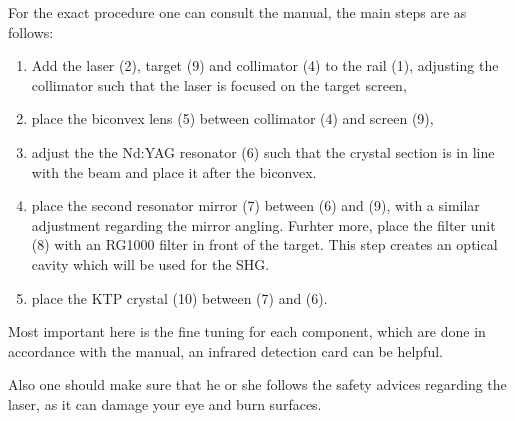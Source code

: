 For the exact procedure one can consult the manual, the main steps are as follows:
\begin{enumerate}
  \item Add the laser (2), target (9) and collimator (4) to the rail (1), adjusting 
    the collimator such that the laser is focused on the target screen,
  \item place the biconvex lens (5) between collimator (4) and screen (9),
  \item adjust the the Nd:YAG resonator (6) such that the crystal section is in line with the beam
    and place it after the biconvex.
  \item place the second resonator mirror (7) between (6) and (9), with a similar adjustment
    regarding the mirror angling. Furhter more, place the filter unit (8) with an RG1000 filter in
    front of the target. This step creates an optical cavity which will be used for the SHG.
  \item place the KTP crystal (10) between (7) and (6).
\end{enumerate}
Most important here is the fine tuning for each component, which are done in accordance with the
manual, an infrared detection card can be helpful.

Also one should make sure that he or she follows the safety advices regarding the laser, as it can
damage your eye and burn surfaces.
